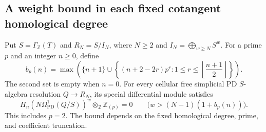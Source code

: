 \subsection{A weight bound in each fixed cotangent homological degree}

\begin{proposition}
\label{AL10}
Put $S=\Gamma_{\mathbb Z}(T)$ and $R_N=S/I_N$, where
$N\geq2$ and $I_N=\bigoplus_{w\geq N}S^w$.
For a prime $p$ and an integer $n\geq0$, define
\[
 b_p(n)=\max\left(\{n+1\}\cup
 \left\{(n+2-2r)p^r:
                  1\leq r\leq\left\lfloor\frac{n+1}{2}\right\rfloor
 \right\}\right).
 \tag{AL.51}
\]
The second set is empty when $n=0$.
For every cellular free simplicial PD $S$-algebra
resolution $Q\longrightarrow R_N$, its special differential
module satisfies
\[
 H_n\!\left(N\Omega^1_{\mathrm{PD}}(Q/S)\right)^w
                  \otimes_{\mathbb Z}\mathbb Z_{(p)}=0
 \qquad\bigl(w>(N-1)(1+b_p(n))\bigr).
 \tag{AL.52}
\]
This includes $p=2$.  The bound depends on the fixed
homological degree, prime, and coefficient truncation.
\end{proposition}


